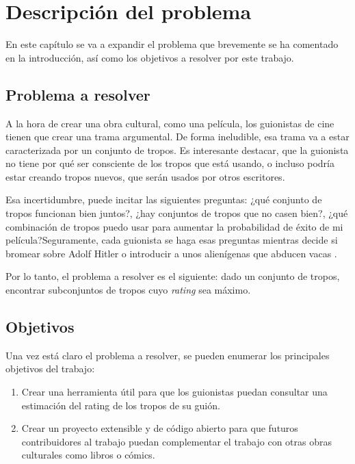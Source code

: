 \chapter{Descripción del problema}

En este capítulo se va a expandir el problema que brevemente se ha comentado en la introducción, así como los objetivos a resolver por este trabajo.

\section{Problema a resolver}

A la hora de crear una obra cultural, como una película, los guionistas de cine tienen que crear una trama argumental. De forma ineludible, esa trama va a estar caracterizada por un conjunto de tropos. Es interesante destacar, que la guionista no tiene por qué ser consciente de los tropos que está usando, o incluso podría estar creando tropos nuevos, que serán usados por otros escritores.

Esa incertidumbre, puede incitar las siguientes preguntas: ¿qué conjunto de tropos funcionan bien juntos?, ¿hay conjuntos de tropos que no casen bien?, ¿qué combinación de tropos puedo usar para aumentar la probabilidad de éxito de mi película?Seguramente, cada guionista se haga esas preguntas mientras decide si bromear sobre Adolf Hitler \cite{tropo:AdolfHitlarious} o introducir a unos alienígenas que abducen vacas \cite{tropo:AliensStealCattle}.

Por lo tanto, el problema a resolver es el siguiente: dado un conjunto de tropos, encontrar subconjuntos de tropos cuyo \emph{rating} sea máximo.

\section{Objetivos} \label{section:goals}

Una vez está claro el problema a resolver, se pueden enumerar los principales objetivos del trabajo:

\begin{enumerate}
    \item Crear una herramienta útil para que los guionistas puedan consultar una estimación del rating de los tropos de su guión.
    \item Crear un proyecto extensible y de código abierto para que futuros contribuidores al trabajo puedan complementar el trabajo con otras obras culturales como libros o cómics.
\end{enumerate}